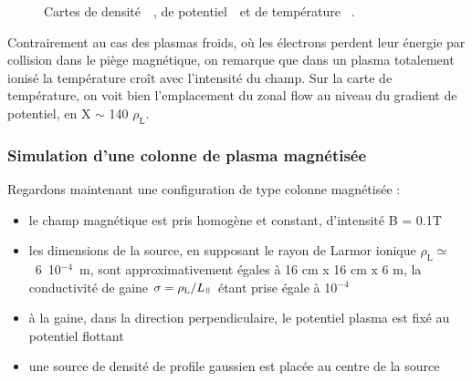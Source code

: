 \begin{refsection}
\begin{figure}[!htbp]
    \caption{Cartes de densité~~, de
    potentiel~~et de température
   ~.}
    \label{2-CartesWithTeFiltre}
	\end{figure}
	
Contrairement au cas des plasmas froids, où les électrons perdent leur énergie
par collision dans le piège magnétique, on
remarque que dans un plasma totalement ionisé la température croît avec
l'intensité du champ. Sur la carte de température, on voit bien l'emplacement du
zonal flow au niveau du gradient de potentiel, en X $\sim$ 140 $\rho_\text{L}$.
	
\subsubsection{Simulation d'une colonne de plasma magnétisée}
Regardons maintenant une configuration de type colonne magnétisée : 

\begin{itemize}
  \item le champ magnétique est pris homogène et constant, d'intensité B = 0.1T
  \item les dimensions de la source, en supposant le rayon de Larmor ionique
  $\rho_\text{L}\simeq$~6~10$^{-4}$~m, sont approximativement égales à 16 cm x
  16 cm x 6 m, la conductivité de gaine $\sigma=\rho_\text{L}/L_\para$ étant prise
  égale à 10$^{-4}$
  \item à la gaine, dans la direction perpendiculaire, le potentiel plasma est
  fixé au potentiel flottant
  \item une source de densité de profile gaussien est placée au centre de la
  source
\end{itemize}


\end{refsection}
